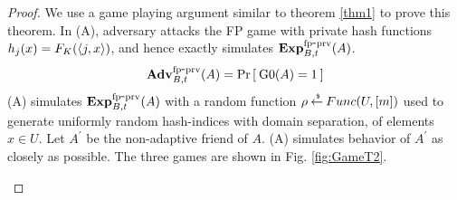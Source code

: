 \begin{proof}
We use a game playing argument similar to theorem \ref{thm1} to prove this theorem. In (A), adversary attacks the FP game with private hash functions $h_j(x) = F_K(\langle j,x \rangle) $, and hence exactly simulates $\mathrm{\mathbf{Exp}}^{\mathrm{fp\mbox{-}prv}}_{B,t}(A)$.
\begin{equation}
\mathrm{\mathbf{Adv}}^{\mathrm{fp\mbox{-}prv}}_{B,t}(A) = \Pr\left[\: \text{G0}(A)=1 \:\right]\label{eq:0T2}
\end{equation}
(A) simulates $\mathrm{\mathbf{Exp}}^{\mathrm{fp\mbox{-}prv}}_{B,t}(A)$ with a random function $\rho {\:\stackrel{{\scriptscriptstyle \hspace{0.2em}\$}} {\leftarrow}\:} Func(U,[m])$ used to generate uniformly random  hash-indices with domain separation, of elements $x \in U$. Let $A^{'}$ be the non-adaptive friend of $A$. (A) simulates behavior of $A^{'}$ as closely as possible. The three games are shown in Fig. \ref{fig:GameT2}.

\begin{figure}
\end{figure}
\end{proof}
